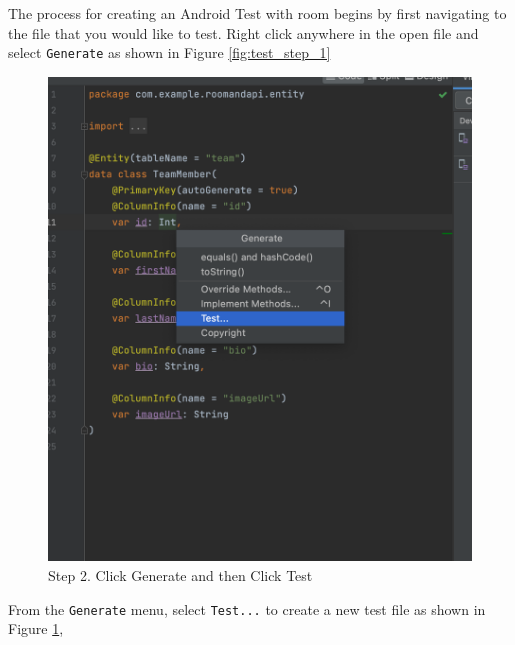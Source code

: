 \documentclass[12pt]{article}
\begin{document}
The process for creating an Android Test with room begins by first navigating to the file that you would like to test. Right click anywhere in the open file and select \verb}Generate} as shown in Figure \ref{fig:test_step_1}

\begin{figure}[H]
    \centering
    \includegraphics[trim=10 10 10 50, clip, width=\textwidth] {images/testing/2_generate_test.png}
    \caption{Step 2. Click Generate and then Click Test}
    \label{fig:test_step_2}
\end{figure}

From the \verb|Generate| menu, select \verb|Test...| to create a new test file as shown in Figure \ref{fig:test_step_2},
\end{document}
